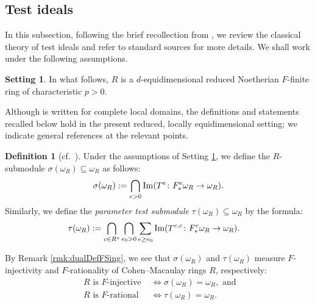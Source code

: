 \documentclass[letterpaper,11pt]{amsart}
\theoremstyle{plain}
\theoremstyle{definition}
\newtheorem{defi}[thm]{Definition}
\newtheorem{setting}[thm]{Setting}
\theoremstyle{remark}
\begin{document}
\subsection{Test ideals} \label{ss:testideals}
In this subsection, following the brief recollection from \cite[Section 2.2]{KTTWYY3},  we review the classical theory of test ideals and refer to standard sources \cites{schwedetucker12,Tak21,SchwedeSmith_FrobeniusSingularities} for more details. We shall work under the following assumptions.
\begin{setting} \label{setting:TestIdealsReview}
In what follows, $R$ is a  $d$-equidimensional reduced Noetherian $F$-finite ring of characteristic $p>0$. 
\end{setting}
\noindent 
Although \cite[Section 2.2]{KTTWYY3} is written for complete local
domains, the definitions and statements recalled below hold in the
present reduced, locally equidimensional setting; we indicate general
references at the relevant points.

\begin{defi}[{cf.\ \cite[Definition 7.1 and Lemma 7.6]{epstein2026closureoperationsinducedresolutions}}] \label{defi:idealspos} Under the assumptions of Setting \ref{setting:TestIdealsReview}, we define the  $R$-submodule $\sigma(\omega_R) \subseteq \omega_R$ as follows:
\begin{align*}
\sigma(\omega_R) := \bigcap_{e>0} {\rm Im}(T^e \colon F^e_*\omega_R \to \omega_R).
\end{align*}
Similarly, we define the \emph{parameter test submodule} $\tau(\omega_R) \subseteq \omega_R$ by the formula:
\begin{align*}\tau(\omega_R) &:= \bigcap_{c \in R^\circ} \bigcap_{e_0>0} \sum_{e \geq e_0} {\rm Im}(T^{e,c} \colon F^e_*\omega_R \to \omega_R).
\end{align*}
\end{defi}

By Remark \ref{rmk:dualDefFSing}, we see that $\sigma(\omega_R)$ and $\tau(\omega_R)$ measure $F$-injectivity and $F$-rationality of Cohen--Macaulay rings $R$, respectively: 
\begin{align*}
\text{ $R$ is $F$-injective } &\iff \sigma(\omega_R)=\omega_R, \text{ and }\\
\text{ $R$ is $F$-rational } &\iff \tau(\omega_R)=\omega_R.
\end{align*}
\end{document}

